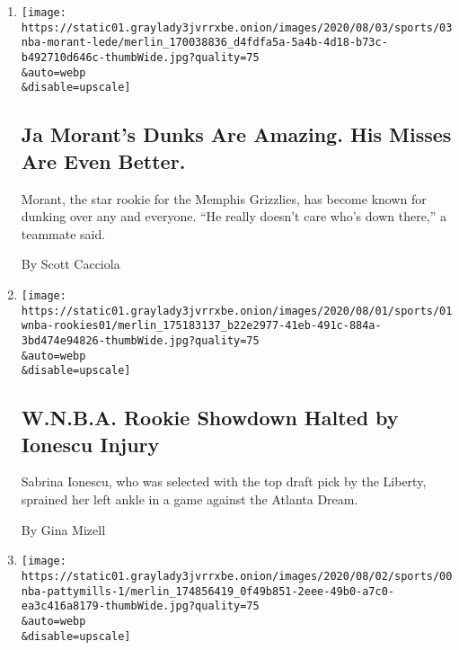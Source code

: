 \begin{enumerate}
\def\labelenumi{\arabic{enumi}.}
\item
  \href{/2020/08/03/sports/basketball/ja-morant-grizzlies-dunks.html}{}

  \texttt{[image: https://static01.graylady3jvrrxbe.onion/images/2020/08/03/sports/03nba-morant-lede/merlin\_170038836\_d4fdfa5a-5a4b-4d18-b73c-b492710d646c-thumbWide.jpg?quality=75\\\&auto=webp\\\&disable=upscale]}

  \hypertarget{ja-morants-dunks-are-amazing-his-misses-are-even-better}{%
  \subsection{Ja Morant's Dunks Are Amazing. His Misses Are Even
  Better.}\label{ja-morants-dunks-are-amazing-his-misses-are-even-better}}

  Morant, the star rookie for the Memphis Grizzlies, has become known
  for dunking over any and everyone. ``He really doesn't care who's down
  there,'' a teammate said.

  By Scott Cacciola
\item
  \href{/2020/08/01/sports/basketball/sabrina-ionescu-injury.html}{}

  \texttt{[image: https://static01.graylady3jvrrxbe.onion/images/2020/08/01/sports/01wnba-rookies01/merlin\_175183137\_b22e2977-41eb-491c-884a-3bd474e94826-thumbWide.jpg?quality=75\\\&auto=webp\\\&disable=upscale]}

  \hypertarget{wnba-rookie-showdown-halted-by-ionescu-injury}{%
  \subsection{W.N.B.A. Rookie Showdown Halted by Ionescu
  Injury}\label{wnba-rookie-showdown-halted-by-ionescu-injury}}

  Sabrina Ionescu, who was selected with the top draft pick by the
  Liberty, sprained her left ankle in a game against the Atlanta Dream.

  By Gina Mizell
\item
  \href{/2020/07/31/sports/basketball/spurs-patty-mills.html}{}

  \texttt{[image: https://static01.graylady3jvrrxbe.onion/images/2020/08/02/sports/00nba-pattymills-1/merlin\_174856419\_0f49b851-2eee-49b0-a7c0-ea3c416a8179-thumbWide.jpg?quality=75\\\&auto=webp\\\&disable=upscale]}

  \hypertarget{the-better-i-got-in-sports-the-worse-the-racism-got}{%
}
\end{enumerate}
